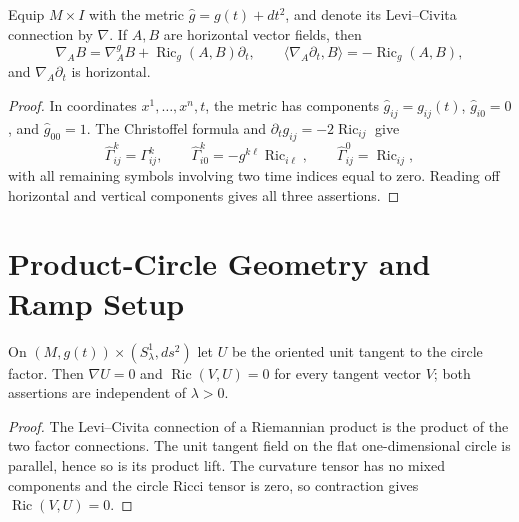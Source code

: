 \begin{lemma}
\label{lem:space-time-metric-connection}
\notready
Equip $M\times I$ with the metric $\widehat g=g(t)+dt^2$, and denote its
Levi--Civita connection by $\nabla$.  If $A,B$ are horizontal vector fields,
then
\[
 \nabla_A B=\nabla_A^gB+\operatorname{Ric}_g(A,B)\partial_t,
 \qquad
 \langle\nabla_A\partial_t,B\rangle
       =-\operatorname{Ric}_g(A,B),
\]
and $\nabla_A\partial_t$ is horizontal.
\end{lemma}
\begin{proof}
In coordinates $x^1,\ldots,x^n,t$, the metric has components
$\widehat g_{ij}=g_{ij}(t)$, $\widehat g_{i0}=0$, and
$\widehat g_{00}=1$.  The Christoffel formula and
$\partial_tg_{ij}=-2\operatorname{Ric}_{ij}$ give
\[
 \widehat\Gamma^k_{ij}=\Gamma^k_{ij},\qquad
 \widehat\Gamma^k_{i0}=-g^{k\ell}\operatorname{Ric}_{i\ell},
 \qquad
 \widehat\Gamma^0_{ij}=\operatorname{Ric}_{ij},
\]
with all remaining symbols involving two time indices equal to zero.  Reading
off horizontal and vertical components gives all three assertions.
\end{proof}

\section{Product-Circle Geometry and Ramp Setup}

\begin{theorem}
\label{lem:product-circle-parallel-geometry}
\notready
On $(M,g(t))\times(S^1_\lambda,ds^2)$ let $U$ be the oriented unit tangent
to the circle factor.  Then $\nabla U=0$ and
$\operatorname{Ric}(V,U)=0$ for every tangent vector $V$; both assertions are
independent of $\lambda>0$.
\end{theorem}
\begin{proof}
The Levi--Civita connection of a Riemannian product is the product of the two
factor connections.  The unit tangent field on the flat one-dimensional
circle is parallel, hence so is its product lift.  The curvature tensor has no
mixed components and the circle Ricci tensor is zero, so contraction gives
$\operatorname{Ric}(V,U)=0$.
\end{proof}

